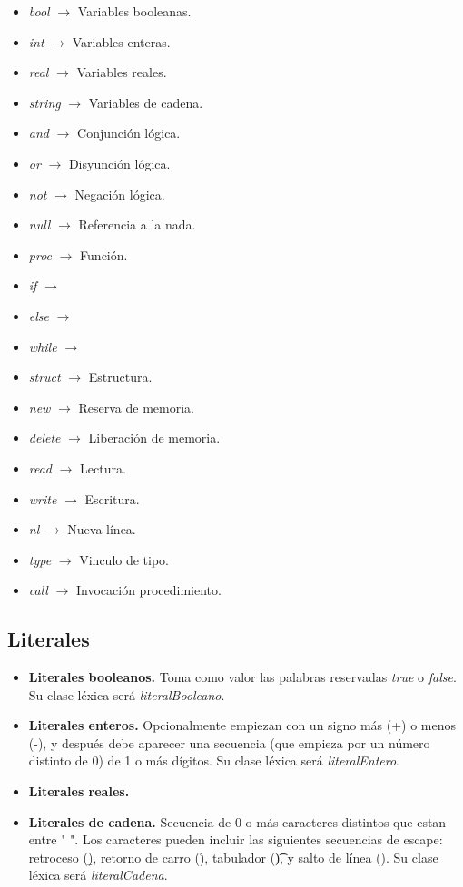 \begin{itemize}
    \item \textit{bool} $\rightarrow$ Variables booleanas.
    \item \textit{int} $\rightarrow$ Variables enteras.
    \item \textit{real} $\rightarrow$ Variables reales.
    \item \textit{string} $\rightarrow$ Variables de cadena.
    \item \textit{and} $\rightarrow$ Conjunción lógica.
    \item \textit{or} $\rightarrow$ Disyunción lógica.
    \item \textit{not} $\rightarrow$ Negación lógica.
    \item \textit{null} $\rightarrow$ Referencia a la nada.
    \item \textit{proc} $\rightarrow$ Función.
    \item \textit{if} $\rightarrow$ 
    \item \textit{else} $\rightarrow$  
    \item \textit{while} $\rightarrow$
    \item \textit{struct} $\rightarrow$ Estructura.
    \item \textit{new} $\rightarrow$ Reserva de memoria.
    \item \textit{delete} $\rightarrow$ Liberación de memoria.
    \item \textit{read} $\rightarrow$ Lectura.
    \item \textit{write} $\rightarrow$ Escritura.
    \item \textit{nl} $\rightarrow$ Nueva línea.
    \item \textit{type} $\rightarrow$ Vinculo de tipo.
    \item \textit{call} $\rightarrow$ Invocación procedimiento.
\end{itemize}

\subsection{Literales}

\begin{itemize}
    \item \textbf{Literales booleanos.} Toma como valor las palabras reservadas \textit{true} o \textit{false}. Su clase léxica será
        \textit{literalBooleano}.
    \item \textbf{Literales enteros.} Opcionalmente empiezan con un signo más (+) o menos (-), y después debe aparecer una
        secuencia (que empieza por un número distinto de 0) de 1 o más dígitos. Su clase léxica será \textit{literalEntero}.
    \item \textbf{Literales reales.}
    \item \textbf{Literales de cadena.} Secuencia de 0 o más caracteres distintos que estan entre "  ". Los caracteres pueden incluir las siguientes secuencias de
    escape: retroceso (\b), retorno de carro (\r), tabulador (\t), y salto de línea (\n). Su clase léxica será \textit{literalCadena}.
\end{itemize}

